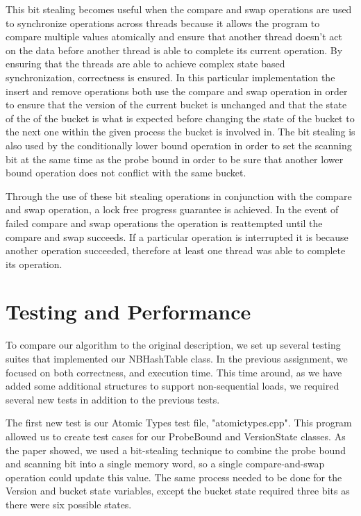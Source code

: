 \documentclass[journal]{IEEEtran}
\begin{document}
This bit stealing becomes useful when the compare and swap operations are used to synchronize operations across threads because it allows the program to compare multiple values atomically and ensure that another thread doesn't act on the data before another thread is able to complete its current operation. By ensuring that the threads are able to achieve complex state based synchronization, correctness is ensured. In this particular implementation the insert and remove operations both use the compare and swap operation in order to ensure that the version of the current bucket is unchanged and that the state of the of the bucket is what is expected before changing the state of the bucket to the next one within the given process the bucket is involved in. The bit stealing is also used by the conditionally lower bound operation in order to set the scanning bit at the same time as the probe bound in order to be sure that another lower bound operation does not conflict with the same bucket. 

Through the use of these bit stealing operations in conjunction with the compare and swap operation, a lock free progress guarantee is achieved. In the event of failed compare and swap operations the operation is reattempted until the compare and swap succeeds. If a particular operation is interrupted it is because another operation succeeded, therefore at least one thread was able to complete its operation.

\section{Testing and Performance}

To compare our algorithm to the original description, we set up several testing suites that implemented our NBHashTable class. In the previous assignment, we focused on both correctness, and execution time. This time around, as we have added some additional structures to support non-sequential loads, we required several new tests in addition to the previous tests.

The first new test is our Atomic Types test file, "atomictypes.cpp". This program allowed us to create test cases for our ProbeBound and VersionState classes. As the paper showed, we used a bit-stealing technique to combine the probe bound and scanning bit into a single memory word, so a single compare-and-swap operation could update this value. The same process needed to be done for the Version and bucket state variables, except the bucket state required three bits as there were six possible states.
\end{document}
